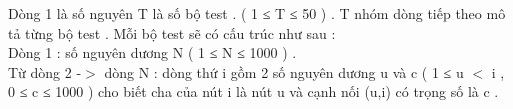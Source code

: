 Dòng 1 là số nguyên T là số bộ test . (  1 ≤ T ≤ 50 ) . T nhóm dòng tiếp theo mô tả từng bộ test . Mỗi bộ test sẽ có cấu trúc như sau :   
\\   Dòng 1 : số nguyên dương N ( 1 ≤ N ≤ 1000 ) .   
\\   Từ dòng 2 -$>$ dòng N : dòng thứ i gồm 2 số nguyên dương u và c ( 1 ≤ u $<$ i , 0 ≤ c ≤ 1000 ) cho biết cha của nút i là nút u và cạnh nối (u,i) có trọng số là c .